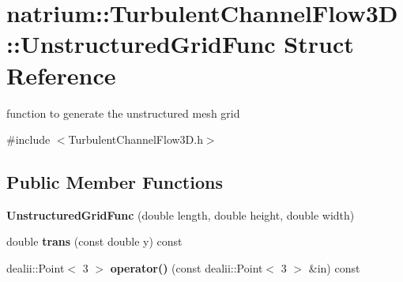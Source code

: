 \hypertarget{structnatrium_1_1TurbulentChannelFlow3D_1_1UnstructuredGridFunc}{
\section{natrium::TurbulentChannelFlow3D::UnstructuredGridFunc Struct Reference}
\label{structnatrium_1_1TurbulentChannelFlow3D_1_1UnstructuredGridFunc}
}


function to generate the unstructured mesh grid  


{\ttfamily \#include $<$TurbulentChannelFlow3D.h$>$}\subsection*{Public Member Functions}
\begin{DoxyCompactItemize}
\item 
\hypertarget{structnatrium_1_1TurbulentChannelFlow3D_1_1UnstructuredGridFunc_aea90ffd6b849946cecb8a6b52adf3eac}{
{\bfseries UnstructuredGridFunc} (double length, double height, double width)}
\label{structnatrium_1_1TurbulentChannelFlow3D_1_1UnstructuredGridFunc_aea90ffd6b849946cecb8a6b52adf3eac}

\item 
\hypertarget{structnatrium_1_1TurbulentChannelFlow3D_1_1UnstructuredGridFunc_acaeb0d4f6fa0ca9c76b14a8f7d35b48d}{
double {\bfseries trans} (const double y) const }
\label{structnatrium_1_1TurbulentChannelFlow3D_1_1UnstructuredGridFunc_acaeb0d4f6fa0ca9c76b14a8f7d35b48d}

\item 
\hypertarget{structnatrium_1_1TurbulentChannelFlow3D_1_1UnstructuredGridFunc_a5415423f679c6bfee1a3e8986bfcca77}{
dealii::Point$<$ 3 $>$ {\bfseries operator()} (const dealii::Point$<$ 3 $>$ \&in) const }
\label{structnatrium_1_1TurbulentChannelFlow3D_1_1UnstructuredGridFunc_a5415423f679c6bfee1a3e8986bfcca77}

\end{DoxyCompactItemize}
